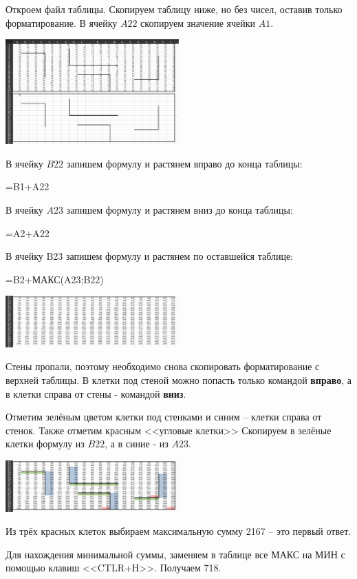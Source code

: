 \documentclass[14pt,a4paper]{article}
\begin{document}
Откроем файл таблицы. Скопируем таблицу ниже, но без чисел, оставив
только форматирование. В ячейку $A22$ скопируем значение ячейки $A1$.

\begin{center}
    \includegraphics[width=0.5\textwidth]{1.png}
\end{center}

В ячейку $B22$ запишем формулу и растянем вправо до конца таблицы:
\begin{center}
    =B1+A22
\end{center}

В ячейку $A23$ запишем формулу и растянем вниз до конца таблицы:
\begin{center}
    =A2+A22
\end{center}

В ячейку B23 запишем формулу и растянем по оставшейся таблице:
\begin{center}
    =B2+МАКС(A23;B22)
\end{center}

\begin{center}
    \includegraphics[width=0.5\textwidth]{2.png}
\end{center}

Стены пропали, поэтому необходимо снова скопировать форматирование с
верхней таблицы. В клетки под стеной можно попасть только командой
\textbf{вправо}, а в клетки справа от стены - командой \textbf{вниз}.

Отметим зелёным цветом клетки под стенками и синим -- клетки справа
от стенок. Также отметим красным <<угловые
клетки>> Скопируем в зелёные клетки формулу из $B22$, а в синие - из
$A23$.

\begin{center}
    \includegraphics[width=0.5\textwidth]{3.png}
\end{center}

Из трёх красных клеток выбираем максимальную сумму 2167 -- это первый
ответ.

Для нахождения минимальной суммы, заменяем в таблице все МАКС на МИН
с помощью клавиш <<CTLR+H>>. Получаем 718.
\end{document}
